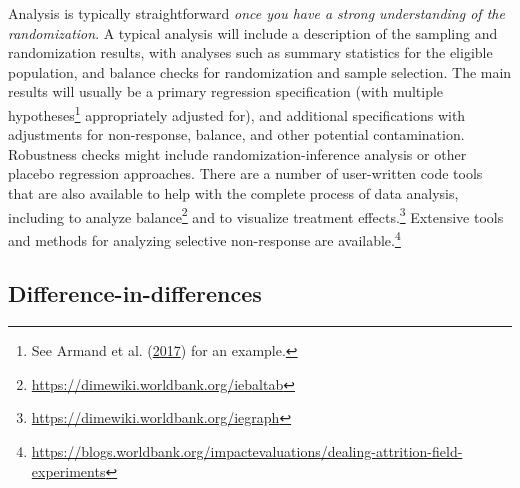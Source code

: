 \documentclass[
]{book}
\begin{document}
Analysis is typically straightforward \emph{once you have a strong understanding of the randomization}.
A typical analysis will include a description of the sampling and randomization results,
with analyses such as summary statistics for the eligible population,
and balance checks for randomization and sample selection.
The main results will usually be a primary regression specification
(with multiple hypotheses\footnote{See Armand et al. (\protect\hyperlink{ref-armand2017public}{2017}) for an example.}
appropriately adjusted for),
and additional specifications with adjustments for non-response, balance, and other potential contamination.
Robustness checks might include randomization-inference analysis or other placebo regression approaches.
There are a number of user-written code tools that are also available
to help with the complete process of data analysis,
including to analyze balance\footnote{\url{https://dimewiki.worldbank.org/iebaltab}}
and to visualize treatment effects.\footnote{\url{https://dimewiki.worldbank.org/iegraph}}
Extensive tools and methods for analyzing selective non-response are available.\footnote{\url{https://blogs.worldbank.org/impactevaluations/dealing-attrition-field-experiments}}

\hypertarget{difference-in-differences}{%
\subsection*{Difference-in-differences}\label{difference-in-differences}}
\end{document}
